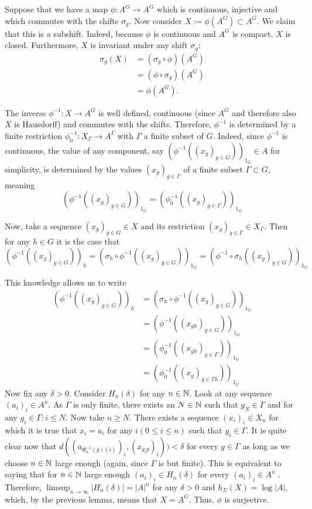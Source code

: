 Suppose that we have a map $\phi: A^G \to A^G$ which is continuous, injective and which commutes with the shifts $\sigma_g$. Now consider $X := \phi(A^G) \subset A^G$. We claim that this is a subshift. Indeed, because $\phi$ is continuous and $A^G$ is compact, $X$ is closed. Furthermore, $X$ is invariant under any shift $\sigma_g$: 
		\begin{align*}
		\sigma_g(X)
		&= (\sigma_g \circ \phi) (A^G) \\
		&= (\phi \circ \sigma_g)(A^G) \\
		&= \phi(A^G).
		\end{align*}
		
The inverse $\phi^{-1}: X \to A^G$ is well defined, continuous (since $A^G$ and therefore also $X$ is Hausdorff) and commutes with the shifts. Therefore,  $\phi^{-1}$ is determined by a finite restriction $\phi^{-1}_0: X_{\Gamma} \to A^{\Gamma}$ with $\Gamma$ a finite subset of $G$. Indeed, since $\phi^{-1}$ is continuous, the value of any component, say $(\phi^{-1}((x_g)_{g \in G}))_{1_G} \in A$ for simplicity, is determined by the values $(x_g)_{g \in \Gamma}$ of a finite subset $\Gamma \subset G$, meaning 
		\[
		(\phi^{-1}((x_g)_{g \in G}))_{1_G} = (\phi^{-1}_0((x_g)_{g \in \Gamma}))_{1_G}
		\]

Now, take a sequence $(x_g)_{g \in G} \in X$ and its restriction $(x_g)_{g \in \Gamma} \in X_{\Gamma}$. Then for any $h \in G$ it is the case that 
		\[
		(\phi^{-1}((x_g)_{g \in G}))_h = (\sigma_h \circ \phi^{-1}((x_g)_{g \in G}))_{1_G}  = (\phi^{-1} \circ \sigma_h((x_g)_{g \in G}))_{1_G}
		\]

This knowledge allows us to write
		\begin{align*}
		(\phi^{-1}((x_g)_{g \in G}))_h
		&= (\sigma_h \circ \phi^{-1}((x_g)_{g \in G}))_{1_G} \\
		&= (\phi^{-1}((x_{gh})_{g \in G}))_{1_G} \\
		&= (\phi^{-1}_0((x_{gh})_{g \in \Gamma}))_{1_G} \\
		&= (\phi^{-1}_0((x_g)_{g \in \Gamma h}))_{1_G}
		\end{align*}
Now fix any $\delta > 0$. Consider $H_n(\delta)$ for any $n \in \mathbb{N}$. Look at any sequence $(a_i)_i \in A^n$. As $\Gamma$ is only finite, there exists an $N \in \mathbb{N}$ such that $g_N \in \Gamma$ and for any $g_i \in \Gamma: i \leq N$. Now take $n \geq N$. There exists a sequence $(x_i)_i \in X_n$ for which it is true that $x_i = a_i$ for any $i(0 \leq i \leq n)$ such that $g_i \in \Gamma$. It is quite clear now that $d((a_{\Phi^{-1}_n(g)(i)})_i,(x_{g_i g})_i)) < \delta$ for every $g \in \Gamma$ as long as we choose $n \in \mathbb{N}$ large enough (again, since $\Gamma$ is but finite). This is equivalent to saying that for $n \in \mathbb{N}$ large enough $(a_i)_i \in H_n(\delta)$ for every $(a_i)_i \in A^n$ . Therefore, $\limsup_{n \to \infty} |H_n(\delta)| = |A|^{n}$ for any $\delta >0$ and $h_\Sigma(X) = \log |A|$, which, by the previous lemma, means that $X = A^G$. Thus, $\phi$ is surjective.


